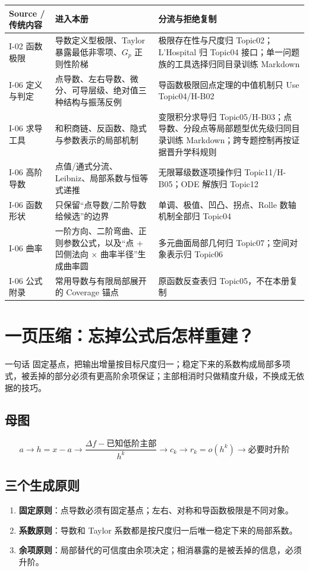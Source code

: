 \documentclass[11pt,a4paper]{ctexart}
\newcommand{\kw}[1]{\textbf{\color{deep}#1}}
\begin{document}
\begin{longtable}{L{2.25cm}L{5.45cm}L{\dimexpr\linewidth-8.35cm\relax}}
\toprule
\textbf{Source / 传统内容} & \textbf{进入本册} & \textbf{分流与拒绝复制}\\
\midrule
I-02 函数极限 & 导数定义型极限、Taylor 暴露最低非零项、$G_p$ 正则性阶梯 & 极限存在性与尺度归 Topic02；L'Hospital 归 Topic04 接口；单一问题族的工具选择归同目录训练 Markdown\\
I-06 定义与判定 & 点导数、左右导数、微分、可导层级、绝对值三种结构与振荡反例 & 导函数极限回点定理的中值机制只 Use Topic04/H-B02\\
I-06 求导工具 & 和积商链、反函数、隐式与参数表示的局部机制 & 变限积分求导归 Topic05/H-B03；点导数、分段点等局部题型优先级归同目录训练 Markdown；跨专题控制再按证据晋升学科规则\\
I-06 高阶导数 & 点值/通式分流、Leibniz、局部系数与恒等式递推 & 无限幂级数逐项操作归 Topic11/H-B05；ODE 解族归 Topic12\\
I-06 函数形状 & 只保留“点导数/二阶导数给候选”的边界 & 单调、极值、凹凸、拐点、Rolle 数轴机制全部归 Topic04\\
I-06 曲率 & 一阶方向、二阶弯曲、正则参数公式，以及“点 + 凹侧法向 $\times$ 曲率半径”生成曲率圆 & 多元曲面局部几何归 Topic07；空间对象表示归 Topic06\\
I-06 公式附录 & 常用导数与有限局部展开的 Coverage 锚点 & 原函数反查表归 Topic05，不在本册复制\\
\bottomrule
\end{longtable}

\section{一页压缩：忘掉公式后怎样重建？}

\begin{corebox}{一句话}
固定基点，把输出增量按目标尺度归一；稳定下来的系数构成局部多项式，被丢掉的部分必须有更高阶余项保证；主部相消时只做精度升级，不换成无依据的技巧。
\end{corebox}

\subsection{母图}
\[
\boxed{
a
\to h=x-a
\to \frac{\Delta f-\text{已知低阶主部}}{h^k}
\to c_k
\to r_k=o(h^k)
\to \text{必要时升阶}}
\]

\subsection{三个生成原则}
\begin{enumerate}
  \item \kw{固定原则}：点导数必须有固定基点；左右、对称和导函数极限是不同对象。
  \item \kw{系数原则}：导数和 Taylor 系数都是按尺度归一后唯一稳定下来的局部系数。
  \item \kw{余项原则}：局部替代的可信度由余项决定；相消暴露的是被丢掉的信息，必须升阶。
\end{enumerate}
\end{document}
